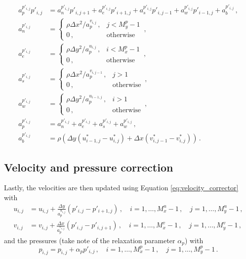 \documentclass{article}
\begin{document}
\begin{subequations}
	\label{eq:pc}
	\begin{align}
		a^{p'_{i,j}}_p p'_{i,j} & = a^{p'_{i,j}}_n p'_{i, j+1} + a^{p'_{i,j}}_e p'_{i+1, j} + a^{p'_{i,j}}_s p'_{i, j-1} + a^{p'_{i,j}}_w p'_{i-1, j} + a_b^{p'_{i,j}}\,,\\
		a^{p'_{i,j}}_n & = \begin{cases}
			\rho \Delta x^2 / a_p^{v_{i, j}}\,, & j < M_y^p - 1 \\
			0\,, & \text{otherwise}
		\end{cases}\,, \\
		a^{p'_{i,j}}_e & = \begin{cases}
			\rho \Delta y^2 / a_p^{u_{i, j}}\,, & i < M_x^p - 1 \\
			0\,, & \text{otherwise}
		\end{cases}\,, \\
		a^{p'_{i,j}}_s & = \begin{cases}
			\rho \Delta x^2 / a_p^{v_{i, j - 1}}\,, & j > 1 \\
			0\,, & \text{otherwise}
		\end{cases}\,, \\
		a^{p'_{i,j}}_w & = \begin{cases}
			\rho \Delta y^2 / a_p^{u_{i - 1, j}}\,, & i > 1 \\
			0\,, & \text{otherwise}
		\end{cases}\,, \\
		a^{p'_{i,j}}_p & = a^{p'_{i,j}}_n + a^{p'_{i,j}}_e + a^{p'_{i,j}}_s + a^{p'_{i,j}}_w\,, \\
		a^{p'_{i,j}}_b & = \rho \left(\Delta y (u_{i - 1, j}^* - u^*_{i,j}) + \Delta x(v^*_{i, j - 1} - v^*_{i,j})\right)\,.
	\end{align}
\end{subequations}

\subsection{Velocity and pressure correction}
\label{subsec:correction}

Lastly, the velocities are then updated using Equation \eqref{eq:velocity_corrector} with
\begin{subequations}
	\begin{align}
		u_{i,j} & = u_{i,j} + \frac{\Delta y}{a_p^{u_{i,j}}} (p'_{i,j} - p'_{i+1,j})\,,\quad i = 1, \ldots, M_x^u - 1\,, \quad j = 1, \ldots, M_y^u - 1\,, \\
		v_{i,j} & = v_{i,j} + \frac{\Delta x}{a_p^{v_{i,j}}} (p'_{i,j} - p'_{i, j+1})\,,\quad i = 1, \ldots, M_x^v - 1\,, \quad j = 1, \ldots, M_y^v - 1\,,
	\end{align}
\end{subequations}
and the pressures  (take note of the relaxation parameter $\alpha_p$) with
\begin{equation}
	p_{i,j} = p_{i,j} + \alpha_p p'_{i,j} \,,\quad i = 1, \ldots, M_x^p - 1\,, \quad j = 1, \ldots, M_y^p - 1\,.
\end{equation}
\end{document}

